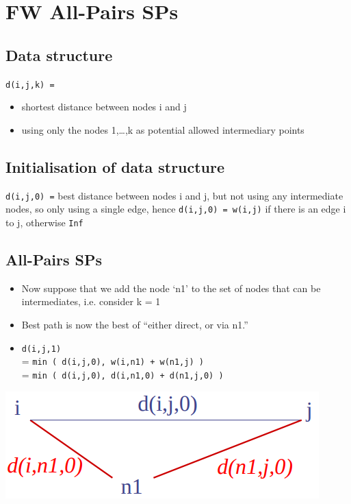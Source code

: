 \documentclass{article}
\begin{document}
\section{FW All-Pairs SPs}

\subsection{Data structure}
\texttt{d(i,j,k) =}
\begin{itemize}
	\item shortest distance between nodes i and j
	\item using only the nodes {1,…,k} as potential allowed intermediary points
\end{itemize}

\subsection{Initialisation of data structure}
\begin{flushleft}
\texttt{d(i,j,0) =} best distance between nodes i and j, but not using any intermediate nodes, so only using a single edge, hence \texttt{d(i,j,0) = w(i,j)} if there is an edge i to j, otherwise \texttt{Inf}
\end{flushleft}

\subsection{All-Pairs SPs}
\begin{itemize}
	\item Now suppose that we add the node ‘n1’ to the set of nodes that can be intermediates, i.e. consider k = 1
	\item Best path is now the best of “either direct, or via n1.”
	\item \texttt{d(i,j,1)} \\
		= \texttt{min ( d(i,j,0), w(i,n1) + w(n1,j) )} \\
		= \texttt{min ( d(i,j,0), d(i,n1,0) + d(n1,j,0) )} \\
\end{itemize}
\begin{center}
	\includegraphics[scale=0.5]{pair_shortest.png}
\end{center}
\end{document}
